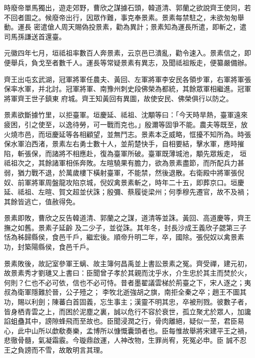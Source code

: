 \begin{pinyinscope}
 時廢帝單馬獨出，遊走郊野，曹欣之謀據石頭，韓道清、郭蘭之欲說齊王使同，若不回者圖之。候廢帝出行，因眾作難，事克奉景素。景素每禁駐之，未欲匆匆舉動。運長
 密遣傖人周天賜偽投景素，勸為異計；景素知為運長所遣，即斬之，遣司馬孫謙送首還臺。



 元徽四年七月，垣祗祖率數百人奔景素，云京邑已潰亂，勸令速入。景素信之，即便舉兵，負戈至者數千人。運長等常疑景素有異志，及聞祗祖叛走，便纂嚴備辦。



 齊王出屯玄武湖，冠軍將軍任農夫、黃回、左軍將軍李安民各領步軍，右軍將軍張保率水軍，并北討。冠軍將軍、南豫州刺史段佛榮為都統，其餘眾軍相繼進。冠軍將軍齊王世子鎮東
 府城。齊王知黃回有異圖，故使安民、佛榮俱行以防之。



 景素欲斷據竹里，以拒臺軍。垣慶延、祗祖、沈顒等曰：「今天時旱熱，臺軍遠來疲困，引之使至，以逸待勞，可一戰而克也。」殷濔等固爭不能。農夫等既至，放火燒市邑，而垣慶延等各相顧望，並無鬥志。景素本乏威略，恇擾不知所為。時張保水軍泊西渚，景素左右勇士數十人，並荊楚快手，自相要結，擊水軍，應時摧陷，斬張保，而諸將不相應赴，復為臺軍所破。臺軍既薄城池，顒先眾叛走，
 垣祗祖次之，其餘諸軍相係奔敗。左暄驍果有膽力，欲為景素盡節，而所配兵力甚弱，猶力戰不退，於萬歲樓下橫射臺軍，不能禁，然後退散。右衛殿中將軍張倪奴、前軍將軍周盤龍攻陷京城，倪奴禽景素斬之，時年二十五，即葬京口。垣慶延、祗祖、左暄、賀文超並伏誅；殷彌、蔡履徙梁州；何季穆先遷官，故不及禍；其餘皆逃亡，值赦得免。



 景素即敗，曹欣之反告韓道清、郭蘭之之謀，道清等並誅。黃回、高道慶等，齊王撫之如舊。景素子延齡
 及二少子，並從誅。其年冬，封長沙成王義欣子勰第三子恬為秭歸縣侯，食邑千戶，繼宏後。順帝升明二年，卒，國除。張倪奴以禽景素功，封築陽縣侯，食邑千戶。



 景素敗後，故記室參軍王螭、故主簿何昌禹並上書訟景素之冤。齊受禪，建元初，故景素秀才劉璡又上書曰：臣聞曾子孝於其親而沈乎水，介生忠於其主而焚於火，何則？仁也不必可依，信也不必可恃。昔者墨翟議雲梯於荊臺之下，宋人逐之；夷叔為衛軍隱難於晉，公子殪之；
 李牧北逝強胡之旗，南拒全秦之卒；趙王不圖其功，賜以利劍；陳蕃白首固義，忘生事主；漢靈不明其忠，卒被刑戮。彼數子者，皆身栖青雲之上，而困於泥塵之裏，誠以危行不容於衰世，孤立聚尤於眾人，加讒諂蛆蠱其中，謗隙蜂飛而至故也。臣聞浸潤之行，骨肉離絕，疑似一至，君臣易心，此中山所以歔欷奏樂，孟博所以慷慨囊頭者也。臣每惟故舉將宋建平王之禍，悲徹骨髓，氣凝霜霰。今璇鼎啟運，人神改物，生罪尚宥，死冤必申。臣
 誠不忍王之負謗而不雪，故敢明言其理。




\end{pinyinscope}
